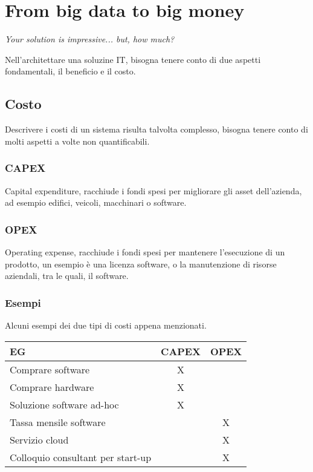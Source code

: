 \section{From big data to big money}
\begin{center}
    \emph{Your solution is impressive... but, how much?}
\end{center}
Nell'architettare una soluzine IT, bisogna tenere conto di due 
aspetti fondamentali, il beneficio e il costo.

\subsection{Costo}
Descrivere i costi di un sistema risulta talvolta complesso, 
bisogna tenere conto di molti aspetti a volte non quantificabili.

\subsubsection{CAPEX}
Capital expenditure, racchiude i fondi spesi per migliorare gli asset dell'azienda, 
ad esempio edifici, veicoli, macchinari o software.

\subsubsection{OPEX}
Operating expense, racchiude i fondi spesi per mantenere l'esecuzione di un prodotto, 
un esempio è una licenza software, o la manutenzione di risorse aziendali, tra 
le quali, il software.

\subsubsection{Esempi}
Alcuni esempi dei due tipi di costi appena menzionati.
\begin{center}
    \begin{tabular}{lcc} 
    \toprule
        EG & CAPEX & OPEX \\
    \midrule
        Comprare software & X &  \\ 
        Comprare hardware & X &  \\
        Soluzione software ad-hoc  & X &  \\
        Tassa mensile software &   & X \\
        Servizio cloud &   & X \\
        Colloquio consultant per start-up &   & X \\
    \bottomrule
   \end{tabular}
\end{center}

